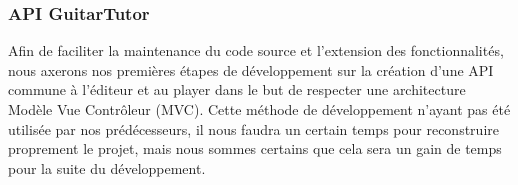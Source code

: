 \documentclass[a4paper,11pt]{article}
\begin{document}
\subsubsection*{API GuitarTutor}

Afin de faciliter la maintenance du code source et l'extension des fonctionnalités, nous axerons nos premières étapes de développement sur la création d'une API commune à l'éditeur et au player dans le but de respecter une architecture Modèle Vue Contrôleur (MVC). Cette méthode de développement n'ayant pas été utilisée par nos prédécesseurs, il nous faudra un certain temps pour reconstruire proprement le projet, mais nous sommes certains que cela sera un gain de temps pour la suite du développement.

\clearpage
\end{document}
